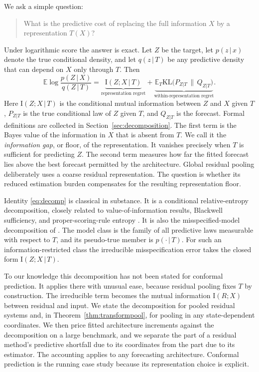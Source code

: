 \documentclass[11pt]{article}
\theoremstyle{remark}
\newcommand{\E}{\mathbb{E}}
\newcommand{\KL}{\mathrm{KL}}
\newcommand{\I}{\mathrm{I}}
\newcommand{\given}{\,|\,}
\begin{document}
We ask a simple question:
\begin{quote}
What is the predictive cost of replacing the full information $X$ by a representation $T(X)$?
\end{quote}

Under logarithmic score the answer is exact. Let $Z$ be the target, let $p(z\given x)$ denote the
true conditional density, and let $q(z\given T)$ be any predictive density that can depend on $X$
only through $T$. Then
\begin{equation}\label{eq:decomp}
\E\log\frac{p(Z\given X)}{q(Z\given T)}
=\underbrace{\I(Z;X\given T)}_{\text{representation regret}}
+\underbrace{\E_T\KL\big(P_{Z|T}\,\|\,Q_{Z|T}\big)}_{\text{within-representation regret}} .
\end{equation}
Here $\I(Z;X\given T)$ is the conditional mutual information between $Z$ and $X$ given $T$,
$P_{Z|T}$ is the true conditional law of $Z$ given $T$, and $Q_{Z|T}$ is the forecast. Formal definitions are collected in
Section~\ref{sec:decomposition}. The first term is the Bayes
value of the information in $X$ that is absent from $T$. We call it the \emph{information
gap}, or floor, of the representation. It vanishes precisely when $T$ is
sufficient for predicting $Z$. The second term measures how far the fitted
forecast lies above the best forecast permitted by the architecture. Global residual pooling deliberately uses a coarse residual representation. The question is
whether its reduced estimation burden compensates for the resulting representation floor.

Identity \eqref{eq:decomp} is classical in substance. It is a conditional relative-entropy
decomposition, closely related to value-of-information results, Blackwell sufficiency, and
proper-scoring-rule entropy
\citep{lindley1956measure,degroot1962uncertainty,blackwell1953equivalent,grunwald2004game}. It
is also the misspecified-model decomposition of \citet{white1982maximum}. The model class is
the family of all predictive laws measurable with respect to $T$, and its pseudo-true member
is $p(\cdot\given T)$. For such an information-restricted class the irreducible
misspecification error takes the closed form $\I(Z;X\given T)$.

To our knowledge this decomposition has not been stated for conformal prediction. It applies
there with unusual ease, because residual pooling fixes $T$ by construction. The irreducible
term becomes the mutual information $\I(R;X)$ between residual and input. We state the decomposition for pooled residual systems and, in
Theorem~\ref{thm:transformpool}, for pooling in any state-dependent coordinates. We then
price fitted architecture increments against the decomposition on a large benchmark, and we
separate the part of a residual method's predictive shortfall due to its coordinates from the
part due to its estimator. The accounting applies to any forecasting architecture. Conformal
prediction is the running case study because its representation choice is explicit.
\end{document}

